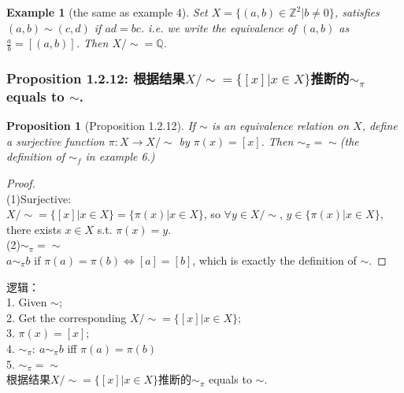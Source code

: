 \documentclass[11pt,a4paper]{article}
\newtheorem{proposition}{Proposition}
\newtheorem{example}{Example}
\begin{document}
\begin{example}[the same as example 4]
    Set $X=\{(a,b)\in \mathbb{Z}^2|b\neq 0 \}$, satisfies $(a,b)\sim(c,d)$ if $ad=bc$. i.e. we write the equivalence of $(a,b)$ as $\frac{a}{b}=[(a,b)]$. Then $X/\sim=\mathbb{Q}$.
\end{example}
\subsubsection{Proposition 1.2.12: 根据结果$X/\sim=\{[x]|x\in X\}$推断的$\sim_\pi$ equals to $\sim$.}
\begin{proposition}[Proposition 1.2.12]
    If $\sim$ is an equivalence relation on $X$, define a surjective function $\pi: X \rightarrow	 X/\sim$ by $\pi(x) = [x]$. Then $\sim_\pi=\sim$(the definition of $\sim_f$ in example 6.)
\end{proposition}
\begin{proof}
\quad\\
(1)Surjective:\\
$X/\sim= \{[x]|x\in X \}=\{\pi(x)|x\in X \}$, so $\forall y\in X/\sim$, $y\in \{\pi(x)|x\in X \}$, there exists $x\in X$ s.t. $\pi(x)=y$.\\
(2)$\sim_\pi=\sim$\\
$a\sim_\pi b$ if $\pi(a)=\pi(b) \Leftrightarrow	[a]=[b]$, which is exactly the definition of $\sim$.
\end{proof}
逻辑：\\
1. Given $\sim$; \\
2. Get the corresponding $X/\sim=\{[x]|x\in X\}$; \\
3. $\pi(x) = [x]$; \\
4. $\sim_\pi:\ a\sim_\pi b$ iff $\pi(a)=\pi(b)$\\
5. $\sim_\pi=\sim$\\
根据结果$X/\sim=\{[x]|x\in X\}$推断的$\sim_\pi$ equals to $\sim$.
\end{document}
